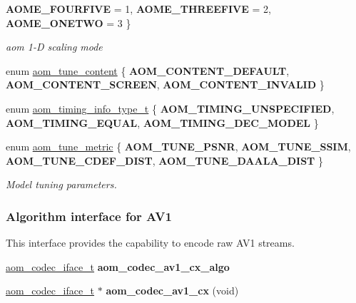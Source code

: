 \begin{DoxyCompactItemize}
{\bfseries A\+O\+M\+E\+\_\+\+F\+O\+U\+R\+F\+I\+VE} = 1, 
{\bfseries A\+O\+M\+E\+\_\+\+T\+H\+R\+E\+E\+F\+I\+VE} = 2, 
{\bfseries A\+O\+M\+E\+\_\+\+O\+N\+E\+T\+WO} = 3
 \}\begin{DoxyCompactList}\small\item\em aom 1-\/D scaling mode \end{DoxyCompactList}
\item 
enum \hyperlink{group__aom__encoder_ga801f5eb2cb93da19a2f347ae7a44166a}{aom\+\_\+tune\+\_\+content} \{ {\bfseries A\+O\+M\+\_\+\+C\+O\+N\+T\+E\+N\+T\+\_\+\+D\+E\+F\+A\+U\+LT}, 
{\bfseries A\+O\+M\+\_\+\+C\+O\+N\+T\+E\+N\+T\+\_\+\+S\+C\+R\+E\+EN}, 
{\bfseries A\+O\+M\+\_\+\+C\+O\+N\+T\+E\+N\+T\+\_\+\+I\+N\+V\+A\+L\+ID}
 \}
\item 
enum \hyperlink{group__aom__encoder_gad69c1d6aa10530991eeb1a3f0a818cba}{aom\+\_\+timing\+\_\+info\+\_\+type\+\_\+t} \{ {\bfseries A\+O\+M\+\_\+\+T\+I\+M\+I\+N\+G\+\_\+\+U\+N\+S\+P\+E\+C\+I\+F\+I\+ED}, 
{\bfseries A\+O\+M\+\_\+\+T\+I\+M\+I\+N\+G\+\_\+\+E\+Q\+U\+AL}, 
{\bfseries A\+O\+M\+\_\+\+T\+I\+M\+I\+N\+G\+\_\+\+D\+E\+C\+\_\+\+M\+O\+D\+EL}
 \}
\item 
enum \hyperlink{group__aom__encoder_gaafd352cc596fab5388558950f8bbe739}{aom\+\_\+tune\+\_\+metric} \{ {\bfseries A\+O\+M\+\_\+\+T\+U\+N\+E\+\_\+\+P\+S\+NR}, 
{\bfseries A\+O\+M\+\_\+\+T\+U\+N\+E\+\_\+\+S\+S\+IM}, 
{\bfseries A\+O\+M\+\_\+\+T\+U\+N\+E\+\_\+\+C\+D\+E\+F\+\_\+\+D\+I\+ST}, 
{\bfseries A\+O\+M\+\_\+\+T\+U\+N\+E\+\_\+\+D\+A\+A\+L\+A\+\_\+\+D\+I\+ST}
 \}\begin{DoxyCompactList}\small\item\em Model tuning parameters. \end{DoxyCompactList}
\end{DoxyCompactItemize}
\subsubsection*{Algorithm interface for A\+V1}
\label{_amgrp8c574bd9a585a04008b0d15257056884}%
This interface provides the capability to encode raw A\+V1 streams. \begin{DoxyCompactItemize}
\item 
\mbox{\label{group__aom__encoder_ga18350b1c0642494e2b1a970104b2e8b9}} 
\hyperlink{group__codec_ga4ef55b44c762836d1550e11921bed403}{aom\+\_\+codec\+\_\+iface\+\_\+t} {\bfseries aom\+\_\+codec\+\_\+av1\+\_\+cx\+\_\+algo}
\item 
\mbox{\label{group__aom__encoder_ga5b742eec203f55a95cc404f41c0166d8}} 
\hyperlink{group__codec_ga4ef55b44c762836d1550e11921bed403}{aom\+\_\+codec\+\_\+iface\+\_\+t} $\ast$ {\bfseries aom\+\_\+codec\+\_\+av1\+\_\+cx} (void)
\end{DoxyCompactItemize}



